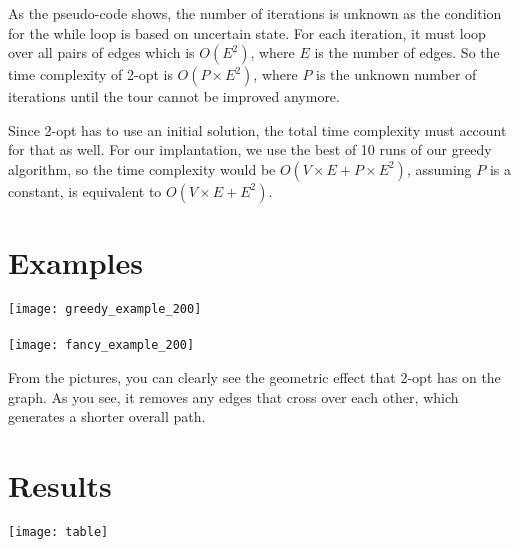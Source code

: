 \documentclass[12pt]{report}
\begin{document}
\begin{multicols}{2}
    As the pseudo-code shows, the number of iterations is unknown as the condition for the while loop is based on uncertain state. For each iteration, it must loop over all pairs of edges which is $O(E^2)$, where $E$ is the number of edges. So the time complexity of 2-opt is $O(P \times E^2)$, where $P$ is the unknown number of iterations until the tour cannot be improved anymore.

    Since 2-opt has to use an initial solution, the total time complexity must account for that as well. For our implantation, we use the best of 10 runs of our greedy algorithm, so the time complexity would be $O(V \times E + P \times E^2)$, assuming $P$ is a constant, is equivalent to $O(V \times E + E^2)$.
\end{multicols}

    \section{Examples}
    \texttt{[image: greedy\_example\_200]} \\
    \\
    \texttt{[image: fancy\_example\_200]} \\

\begin{multicols}{2}
    From the pictures, you can clearly see the geometric effect that 2-opt has on the graph. As you see, it removes any edges that cross over each other, which generates a shorter overall path.
\end{multicols}

    \section{Results}
    \begin{adjustwidth}{-3cm}{100cm}
    \texttt{[image: table]}
    \end{adjustwidth}
\end{document}
